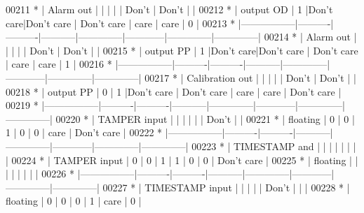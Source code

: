 \begin{DoxyCode}
00211 \textcolor{comment}{  * |   Alarm out     |          |          |           |              |    Don't   |     Don't    |  
                  |}
00212 \textcolor{comment}{  * |   output OD     |     1    |Don't care|Don't care | Don't care   |    care    |     care     |  
          0       |}
00213 \textcolor{comment}{  *
       |-----------------|----------|----------|-----------|--------------|------------|--------------|--------------|}
00214 \textcolor{comment}{  * |   Alarm out     |          |          |           |              |    Don't   |     Don't    |  
                  |}
00215 \textcolor{comment}{  * |   output PP     |     1    |Don't care|Don't care | Don't care   |    care    |     care     |  
          1       |}
00216 \textcolor{comment}{  *
       |-----------------|----------|----------|-----------|--------------|------------|--------------|--------------|}
00217 \textcolor{comment}{  * | Calibration out |          |          |           |              |    Don't   |     Don't    |  
                  |}
00218 \textcolor{comment}{  * |   output PP     |     0    |    1     |Don't care | Don't care   |    care    |     care     | 
       Don't care  |}
00219 \textcolor{comment}{  *
       |-----------------|----------|----------|-----------|--------------|------------|--------------|--------------|}
00220 \textcolor{comment}{  * |  TAMPER input   |          |          |           |              |            |     Don't    |  
                  |}
00221 \textcolor{comment}{  * |   floating      |     0    |    0     |     1     |      0       |      0     |     care     | 
       Don't care  |}
00222 \textcolor{comment}{  *
       |-----------------|----------|----------|-----------|--------------|------------|--------------|--------------|}
00223 \textcolor{comment}{  * |  TIMESTAMP and  |          |          |           |              |            |              |  
                  |}
00224 \textcolor{comment}{  * |  TAMPER input   |     0    |    0     |     1     |      1       |      0     |      0       | 
       Don't care  |}
00225 \textcolor{comment}{  * |   floating      |          |          |           |              |            |              |  
                  |}
00226 \textcolor{comment}{  *
       |-----------------|----------|----------|-----------|--------------|------------|--------------|--------------|}
00227 \textcolor{comment}{  * | TIMESTAMP input |          |          |           |              |    Don't   |              |  
                  |}
00228 \textcolor{comment}{  * |    floating     |     0    |    0     |     0     |      1       |    care    |      0       | 
}
\end{DoxyCode}
